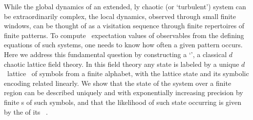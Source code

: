 

While the global dynamics of an extended, {\spt}ly chaotic (or
`turbulent') system can be extraordinarily complex, the local dynamics,
observed through small {\spt} finite windows, can be thought of as a
visitation sequence through finite repertoires of finite patterns.
To compute \spt\ expectation values of observables from the defining
equations of such systems,  one needs to know how often a given pattern
occurs.
Here we address this fundamental question by constructing a
`\catlatt', a classical $d$\dmn\ {\spt} chaotic lattice field theory.
In this field theory any {\spt} state is labeled by a unique $d$\dmn\
lattice \brick\ of symbols from a finite alphabet, with the lattice
state and its symbolic encoding related linearly.
We show that the state of the system over a finite {\spt} region can be
described uniquely and with exponentially increasing precision by finite
\brick s of such symbols, and that the likelihood of such state
occurring is given by the {\HillDet} of its \spt\ {\jacobianOrb}.
